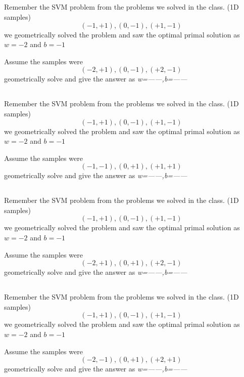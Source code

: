 \begin{frame}
\section{}
Remember the SVM problem from the problems we solved in the class. (1D samples)
\[ (-1,+1), (0,-1), (+1,-1) \]
we geometrically solved the problem and saw the optimal primal solution as $w=-2$ and $b=-1$

Assume the samples were
\[ (-2,+1), (0,-1), (+2,-1) \]
geometrically solve and give the answer as \textit{w=------,b=------}


\end{frame}


\begin{frame}
\section{}
Remember the SVM problem from the problems we solved in the class. (1D samples)
\[ (-1,+1), (0,-1), (+1,-1) \]
we geometrically solved the problem and saw the optimal primal solution as $w=-2$ and $b=-1$

Assume the samples were
\[ (-1,-1), (0,+1), (+1,+1) \]
geometrically solve and give the answer as \textit{w=------,b=------}



\end{frame}


\begin{frame}
\section{}
Remember the SVM problem from the problems we solved in the class. (1D samples)
\[ (-1,+1), (0,-1), (+1,-1) \]
we geometrically solved the problem and saw the optimal primal solution as $w=-2$ and $b=-1$

Assume the samples were
\[ (-2,+1), (0,+1), (+2,-1) \]
geometrically solve and give the answer as \textit{w=------,b=------}



\end{frame}


\begin{frame}
\section{}
Remember the SVM problem from the problems we solved in the class. (1D samples)
\[ (-1,+1), (0,-1), (+1,-1) \]
we geometrically solved the problem and saw the optimal primal solution as $w=-2$ and $b=-1$

Assume the samples were
\[ (-2,-1), (0,+1), (+2,+1) \]
geometrically solve and give the answer as \textit{w=------,b=------}




\end{frame}


